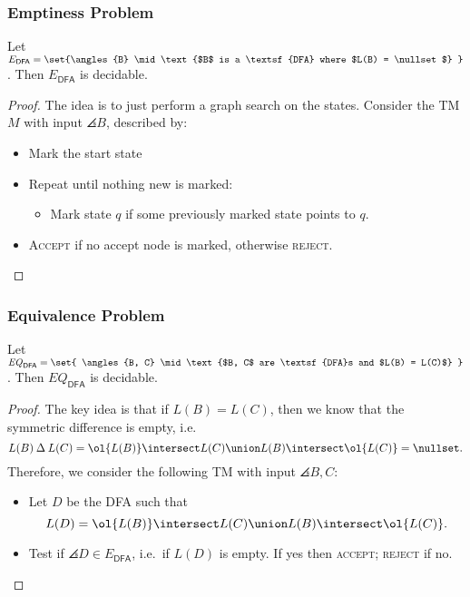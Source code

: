 \documentclass{standalone}
\begin{document}
\subsubsection{Emptiness Problem}
\begin{proposition}
  Let \(E_{\textsf{DFA}} = \set{\angles{B} \mid
    \text{$B$ is a \textsf{DFA} where $L(B) = \nullset$}
  }\). Then \(E_{\textsf{DFA}}\) is decidable.
\end{proposition}
\begin{proof}
  The idea is to just perform a graph search on the states.
  Consider the \textsf{TM} \(M\) with input \(\angles B\), described by:
  \begin{itemize}
    \item Mark the start state
    \item Repeat until nothing new is marked:
    \begin{itemize}[nosep]
      \item Mark state \(q\) if some previously marked state points to \(q\).
    \end{itemize}
    \item \textsc{Accept} if no accept node is marked,
          otherwise \textsc{reject}. \qedhere
  \end{itemize}
\end{proof}

\subsubsection{Equivalence Problem}
\begin{proposition}
  Let \(\mathit{EQ}_{\textsf{DFA}} = \set{
    \angles{B, C} \mid \text{$B, C$ are \textsf{DFA}s and $L(B) = L(C)$}
  }\). Then \(EQ_{\textsf{DFA}}\) is decidable.
\end{proposition}
\begin{proof}
  The key idea is that if \(L(B) = L(C)\),
  then we know that the symmetric difference is empty, i.e.
  \[
    L(B) \mathbin{\Delta} L(C)
      = \ol{L(B)} \intersect L(C) \union L(B) \intersect \ol{L(C)}
      = \nullset.
  \]
  Therefore, we consider the following \textsf{TM}
  with input \(\angles{B, C}\):
  \begin{itemize}
    \item Let \(D\) be the \textsf{DFA} such that
    \[
      L(D) = \ol{L(B)} \intersect L(C) \union L(B) \intersect \ol{L(C)}.
    \]
    \item Test if \(\angles{D} \in E_{\textsf{DFA}}\),
          i.e.\ if \(L(D)\) is empty.
          If yes then \textsc{accept}; \textsc{reject} if no. \qedhere
  \end{itemize}
\end{proof}
\end{document}
